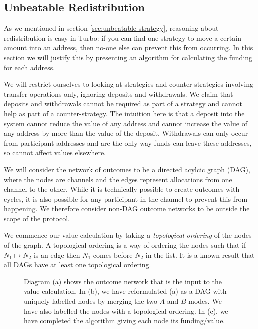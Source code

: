 \subsection{Unbeatable Redistribution}

As we mentioned in section \ref{sec:unbeatable-strategy}, reasoning about redistribution is easy in Turbo: if you can find one strategy to move a certain amount into an address, then no-one else can prevent this from occurring.
In this section we will justify this by presenting an algorithm for calculating the funding for each address.

We will restrict ourselves to looking at strategies and counter-strategies involving transfer operations only, ignoring deposits and withdrawals.
We claim that deposits and withdrawals cannot be required as part of a strategy and cannot help as part of a counter-strategy.
The intuition here is that a deposit into the system cannot reduce the value of any address and cannot increase the value of any address by more than the value of the deposit.
Withdrawals can only occur from participant addresses and are the only way funds can leave these addresses, so cannot affect values elsewhere.

We will consider the network of outcomes to be a directed acylcic graph (DAG), where the nodes are channels and the edges represent allocations from one channel to the other.
While it is technically possible to create outcomes with cycles, it is also possible for any participant in the channel to prevent this from happening.
We therefore consider non-DAG outcome networks to be outside the scope of the protocol.

We commence our value calculation by taking a \textit{topological ordering} of the nodes of the graph.
A topological ordering is a way of ordering the nodes such that if $N_1 \mapsto N_2$ is an edge then $N_1$ comes before $N_2$ in the list.
It is a known result that all DAGs have at least one topological ordering.

\begin{figure}[h]\centering
  \makebox[\textwidth][c]{}
  \caption{
    Diagram (a) shows the outcome network that is the input to the value calculation.
    In (b), we have reformulated (a) as a DAG with uniquely labelled nodes by merging the two $A$ and $B$ modes.
    We have also labelled the nodes with a topological ordering.
    In (c), we have completed the algorithm giving each node its funding/value.
  }\label{fig:turbo-redistribution}
\end{figure}

